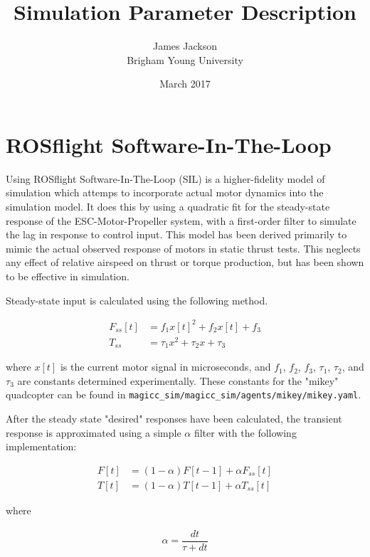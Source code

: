 \documentclass{article}
\title{Simulation Parameter Description}
\author{James Jackson \\ Brigham Young University}
\date{March 2017}
\begin{document}
\maketitle

\section{ROSflight Software-In-The-Loop}

Using ROSflight Software-In-The-Loop (SIL) is a higher-fidelity model of simulation which attemps to incorporate actual motor dynamics into the simulation model.  It does this by using a quadratic fit for the steady-state response of the ESC-Motor-Propeller system, with a first-order filter to simulate the lag in response to control input. This model has been derived primarily to mimic the actual observed response of motors in static thrust tests.  This neglects any effect of relative airspeed on thrust or torque production, but has been shown to be effective in simulation.

Steady-state input is calculated using the following method.

\begin{equation}
\begin{aligned}
	F_{ss}[t] &= f_1 x[t]^2 + f_2 x[t] + f_3 \\
	T_{ss} &= \tau_1 x^2 + \tau_2 x + \tau_3
\end{aligned}
\end{equation}

where $x[t]$ is the current motor signal in microseconds, and $f_1$, $f_2$, $f_3$, $\tau_1$, $\tau_2$, and $\tau_3$ are constants determined experimentally.  These constants for the "mikey" quadcopter can be found in \verb|magicc_sim/magicc_sim/agents/mikey/mikey.yaml|.

After the steady state "desired" responses have been calculated, the transient response is approximated using a simple $\alpha$ filter with the following implementation:

\begin{equation}
\begin{aligned}
	F[t] &= (1 - \alpha)F[t-1] + \alpha F_{ss}[t] \\
	T[t] &= (1 - \alpha)T[t-1] + \alpha T_{ss}[t]
\end{aligned}
\end{equation}

where 

\begin{equation}
\begin{aligned}
	\alpha = \dfrac{dt}{\tau + dt}
\end{aligned}
\end{equation}
\end{document}
